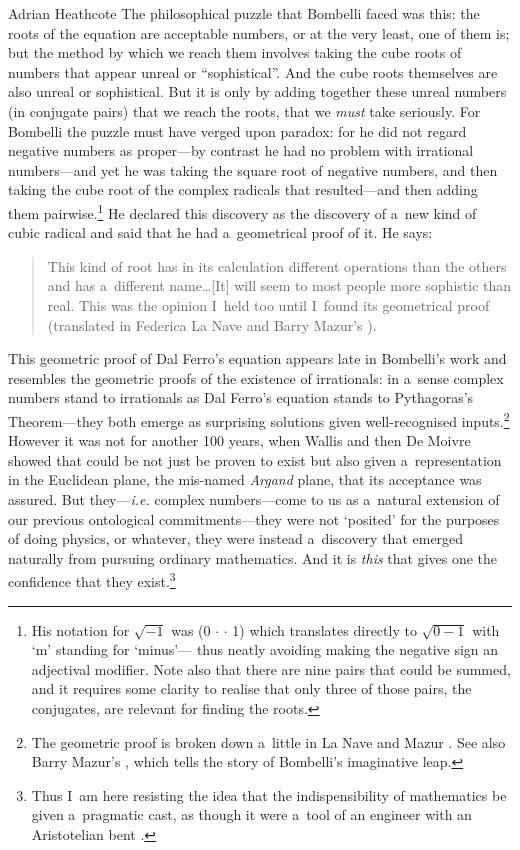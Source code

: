 \begin{artengenv}{Adrian Heathcote}
The philosophical puzzle that Bombelli faced was this: the roots of the equation are acceptable numbers, or at the very least, one of them is; but the method by which we reach them involves taking the cube roots of numbers that appear unreal or ``sophistical''. And the cube roots themselves are also unreal or sophistical. But it is only by adding together these unreal numbers (in conjugate pairs) that we reach the roots, that we \textit{must} take seriously. For Bombelli the puzzle must have verged upon paradox: for he did not regard negative numbers as proper---by contrast he had no problem with irrational numbers---and yet he was taking the square root of negative numbers, and then taking the cube root of the complex radicals that resulted---and then adding them pairwise.\footnote{His notation for $\sqrt{-1}$ was  (0 $\cdot$  $\cdot$ 1) which translates directly to $\sqrt{0 - 1}$ with `m' standing for `minus'--- thus neatly avoiding making the negative sign an adjectival modifier. Note also that there are nine pairs that could be summed, and it requires some clarity to realise that only three of those pairs, the conjugates, are relevant for finding the roots.} He declared this discovery as the discovery of a~new kind of cubic radical and said that he had a~geometrical proof of it. He says:
\begin{quotation}\noindent
This kind of root has in its calculation different operations than the others and has a~different name\ldots [It] will seem to most people more sophistic than real. This was the opinion I~held too until I~found its geometrical proof (translated in Federica La Nave and Barry Mazur's \parencite*{la_nave_reading_2002}).
\end{quotation}
This geometric proof of Dal Ferro's equation appears late in Bombelli's work and resembles the geometric proofs of the existence of irrationals: in a~sense complex numbers stand to irrationals as Dal Ferro's equation stands to Pythagoras's Theorem---they both emerge as surprising solutions given well-recognised inputs.\footnote{The geometric proof is broken down a~little in La Nave and Mazur \parencite*[17ff]{la_nave_reading_2002}.  See also Barry Mazur's \parencite*{mazur_imagining_2004}, which tells the story of Bombelli's imaginative leap.} However it was not for another 100 years, when Wallis and then De Moivre showed that  could be not just be proven to exist but also given a~representation in the Euclidean plane, the mis-named \textit{Argand} plane, that its acceptance was assured. But they---\emph{i.e.} complex numbers---come to us as a~natural extension of our previous ontological commitments---they were not `posited' for the purposes of doing physics, or whatever, they were instead a~discovery that emerged naturally from pursuing ordinary mathematics. And it is \textit{this} that gives one the confidence that they exist.\footnote{Thus I~am here resisting the idea that the indispensibility of mathematics be given a~pragmatic cast, as though it were a~tool of an engineer with an Aristotelian bent \parencite[\qv,][]{newstead_indispensability_2012}.}


\end{artengenv}
